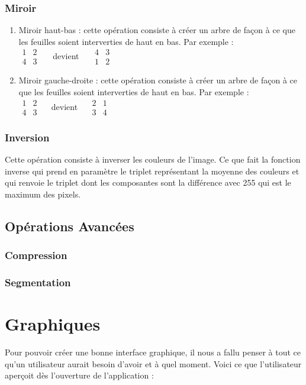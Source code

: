 \documentclass[12pt]{article}
\begin{document}
\subsubsection{Miroir}
\begin{enumerate}
\item Miroir haut-bas : cette opération consiste à créer un arbre de façon à ce que les feuilles soient interverties de haut en bas. Par exemple : \\
		   $\begin{matrix}
		   1 & 2 \\
		   4 & 3
		   \end{matrix} \quad $\ devient\
		   $\quad \begin{matrix}
		   4 & 3 \\
		   1 & 2
		   \end{matrix}$
\item Miroir gauche-droite : cette opération consiste à créer un arbre de façon à ce que les feuilles soient interverties de haut en bas. Par exemple :  \\
		   $\begin{matrix}
		   1 & 2 \\
		   4 & 3
		   \end{matrix} \quad$ devient
		   $\quad  \begin{matrix}
		   2 & 1 \\
		   3 & 4
		   \end{matrix}$
\end{enumerate}
\subsubsection{Inversion}
Cette opération consiste à inverser les couleurs de l'image. Ce que fait la fonction inverse qui prend en paramètre le triplet représentant la moyenne des couleurs et qui renvoie le triplet dont les composantes sont la différence avec 255 qui est le maximum des pixels. 
\subsection{Opérations Avancées}
\subsubsection{Compression}
\subsubsection{Segmentation}
\section{Graphiques}
Pour pouvoir créer une bonne interface graphique, il nous a fallu penser à tout ce qu'un utilisateur aurait besoin d'avoir et à quel moment. Voici ce que l'utilisateur aperçoit dès l'ouverture de l'application :\\
\end{document}
